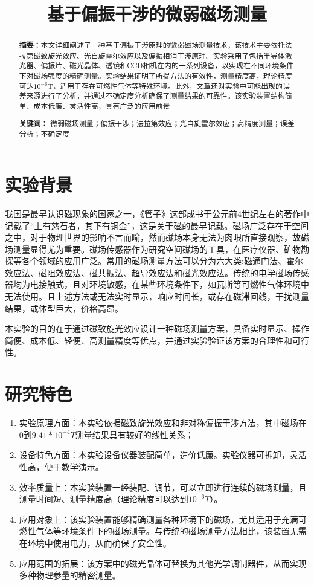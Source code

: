 \documentclass[12pt]{ctexart}
\title{\vspace*{0in} %
\centering\bfseries\Huge 基于偏振干涉的微弱磁场测量} %
\author{}
\date{}
\numberwithin{equation}{section} %
\begin{document}
\maketitle
\begin{abstract}
     \vspace{-1in} %
     \textbf{摘要：}本文详细阐述了一种基于偏振干涉原理的微弱磁场测量技术，该技术主要依托法拉第磁致旋光效应、光自旋霍尔效应以及偏振相消干涉原理。实验采用了包括半导体激光器、偏振片、磁光晶体、透镜和CCD相机在内的一系列设备，以实现在不同环境条件下对磁场强度的精确测量。实验结果证明了所提方法的有效性，测量精度高，理论精度可达$10^{−6}$T，适用于存在可燃性气体等特殊环境。此外，文章还对实验中可能出现的误差来源进行了分析，并通过不确定度分析确保了测量结果的可靠性。该实验装置结构简单、成本低廉、灵活性高，具有广泛的应用前景
    
     \textbf{关键词：} 微弱磁场测量；偏振干涉；法拉第效应；光自旋霍尔效应；高精度测量；误差分析；不确定度
\end{abstract}

\tableofcontents
\newpage
\section{实验背景}
我国是最早认识磁现象的国家之一，《管子》这部成书于公元前4世纪左右的著作中记载了“上有慈石者，其下有铜金”，这是关于磁的最早记载。磁场广泛存在于空间之中，对于物理世界的影响不言而喻，然而磁场本身无法为肉眼所直接观察，故磁场测量显得尤为重要。磁场传感器作为研究空间磁场的工具，在医疗仪器、矿物勘探等各个领域的应用广泛。常用的磁场测量方法可以分为六大类:磁通门法、霍尔效应法、磁阻效应法、磁共振法、超导效应法和磁光效应法。传统的电学磁场传感器均为电接触式，且对环境敏感，在某些环境条件下，如瓦斯等可燃性气体环境中无法使用。且上述方法或无法实时显示，响应时间长，或存在磁滞回线，干扰测量结果，或体型巨大，价格高昂。

本实验的目的在于通过磁致旋光效应设计一种磁场测量方案，具备实时显示、操作简便、成本低、轻便、高测量精度等优点，并通过实验验证该方案的合理性和可行性。
\section{研究特色}
\begin{enumerate}
    \item 实验原理方面：本实验依据磁致旋光效应和非对称偏振干涉方法，其中磁场在$0$到$9.41*10^{-4}T$测量结果具有较好的线性关系；
    \item 设备特色方面：本实验设备仪器装配简单，造价低廉。实验仪器可拆卸，灵活性高，便于教学演示。
    \item 效率质量上：本实验装置一经装配、调节，可以立即进行连续的磁场测量，且测量时间短、测量精度高（理论精度可以达到$10^{-6}T$）。
    \item 应用对象上：该实验装置能够精确测量各种环境下的磁场，尤其适用于充满可燃性气体等环境条件下的磁场测量。与传统的磁场测量方法相比，该装置无需在环境中使用电力，从而确保了安全性。
    \item 应用范围的拓展：该方案中的磁光晶体可替换为其他光学调制器件，从而实现多种物理参量的精密测量。
\end{enumerate}
\end{document}
